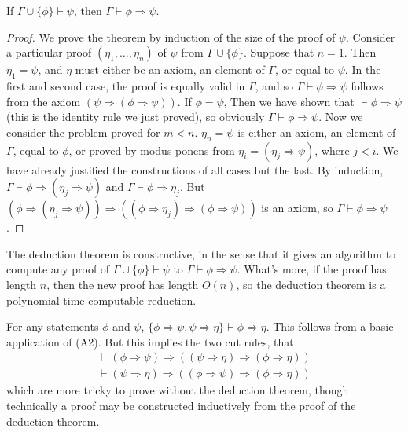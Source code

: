 \begin{theorem}
    If $\Gamma \cup \{ \phi \} \vdash \psi$, then $\Gamma \vdash \phi \Rightarrow \psi$.
\end{theorem}
\begin{proof}
    We prove the theorem by induction of the size of the proof of $\psi$. Consider a particular proof $(\eta_1, \dots, \eta_n)$ of $\psi$ from $\Gamma \cup \{ \phi \}$. Suppose that $n = 1$. Then $\eta_1 = \psi$, and $\eta$ must either be an axiom, an element of $\Gamma$, or equal to $\psi$. In the first and second case, the proof is equally valid in $\Gamma$, and so $\Gamma \vdash \phi \Rightarrow \psi$ follows from the axiom $(\psi \Rightarrow (\phi \Rightarrow \psi))$. If $\phi = \psi$, Then we have shown that $\vdash \phi \Rightarrow \psi$ (this is the identity rule we just proved), so obviously $\Gamma \vdash \phi \Rightarrow \psi$. Now we consider the problem proved for $m < n$. $\eta_n = \psi$ is either an axiom, an element of $\Gamma$, equal to $\phi$, or proved by modus ponens from $\eta_i = (\eta_j \Rightarrow \psi)$, where $j < i$. We have already justified the constructions of all cases but the last. By induction, $\Gamma \vdash \phi \Rightarrow (\eta_j \Rightarrow \psi)$ and $\Gamma \vdash \phi \Rightarrow \eta_j$. But $(\phi \Rightarrow (\eta_j \Rightarrow \psi)) \Rightarrow ((\phi \Rightarrow \eta_j) \Rightarrow (\phi \Rightarrow \psi))$ is an axiom, so $\Gamma \vdash \phi \Rightarrow \psi$.
\end{proof}

The deduction theorem is constructive, in the sense that it gives an algorithm to compute any proof of $\Gamma \cup \{ \phi \} \vdash \psi$ to $\Gamma \vdash \phi \Rightarrow \psi$. What's more, if the proof has length $n$, then the new proof has length $O(n)$, so the deduction theorem is a polynomial time computable reduction.

\begin{example}
    For any statements $\phi$ and $\psi$, $\{ \phi \Rightarrow \psi, \psi \Rightarrow \eta \} \vdash \phi \Rightarrow \eta$. This follows from a basic application of (A2). But this implies the two cut rules, that
    \begin{gather*}
        \vdash (\phi \Rightarrow \psi) \Rightarrow ((\psi \Rightarrow \eta) \Rightarrow (\phi \Rightarrow \eta))\\
        \vdash (\psi \Rightarrow \eta) \Rightarrow ((\phi \Rightarrow \psi) \Rightarrow (\phi \Rightarrow \eta))
    \end{gather*}
    which are more tricky to prove without the deduction theorem, though technically a proof may be constructed inductively from the proof of the deduction theorem.
\end{example}

